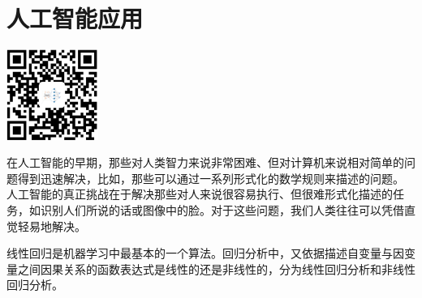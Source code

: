 \part{人工智能应用}
\label{part:ai_learning}

\newpage

\begin{center}{\includegraphics[width=3cm]{barcode.png}}\end{center}\par

在人工智能的早期，那些对人类智力来说非常困难、但对计算机来说相对简单的问题得到迅速解决，比如，那些可以通过一系列形式化的数学规则来描述的问题。
人工智能的真正挑战在于解决那些对人来说很容易执行、但很难形式化描述的任务，如识别人们所说的话或图像中的脸。对于这些问题，我们人类往往可以凭借直觉轻易地解决。

线性回归是机器学习中最基本的一个算法。回归分析中，又依据描述自变量与因变量之间因果关系的函数表达式是线性的还是非线性的，分为线性回归分析和非线性回归分析。


